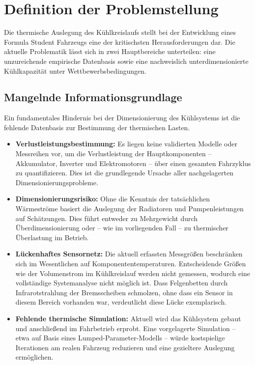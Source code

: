 \chapter{Definition der Problemstellung}
\label{ch:problemstellung}

Die thermische Auslegung des Kühlkreislaufs stellt bei der Entwicklung eines Formula Student Fahrzeugs eine der kritischsten Herausforderungen dar. Die aktuelle Problematik lässt sich in zwei Hauptbereiche unterteilen: eine unzureichende empirische Datenbasis sowie eine nachweislich unterdimensionierte Kühlkapazität unter Wettbewerbsbedingungen.

\section{Mangelnde Informationsgrundlage}
\label{sec:informationsgrundlage}

Ein fundamentales Hindernis bei der Dimensionierung des Kühlsystems ist die fehlende Datenbasis zur Bestimmung der thermischen Lasten.

\begin{itemize}
    \item \textbf{Verlustleistungsbestimmung:} Es liegen keine validierten Modelle oder Messreihen vor, um die Verlustleistung der Hauptkomponenten -- Akkumulator, Inverter und Elektromotoren -- über einen gesamten Fahrzyklus zu quantifizieren. Dies ist die grundlegende Ursache aller nachgelagerten Dimensionierungsprobleme.
    \item \textbf{Dimensionierungsrisiko:} Ohne die Kenntnis der tatsächlichen Wärmeströme basiert die Auslegung der Radiatoren und Pumpenleistungen auf Schätzungen. Dies führt entweder zu Mehrgewicht durch Überdimensionierung oder -- wie im vorliegenden Fall -- zu thermischer Überlastung im Betrieb.
    \item \textbf{Lückenhaftes Sensornetz:} Die aktuell erfassten Messgrößen beschränken sich im Wesentlichen auf Komponententemperaturen. Entscheidende Größen wie der Volumenstrom im Kühlkreislauf werden nicht gemessen, wodurch eine vollständige Systemanalyse nicht möglich ist. Dass Felgenbetten durch Infrarotstrahlung der Bremsscheiben schmolzen, ohne dass ein Sensor in diesem Bereich vorhanden war, verdeutlicht diese Lücke exemplarisch.
    \item \textbf{Fehlende thermische Simulation:} Aktuell wird das Kühlsystem gebaut und anschließend im Fahrbetrieb erprobt. Eine vorgelagerte Simulation -- etwa auf Basis eines Lumped-Parameter-Modells -- würde kostspielige Iterationen am realen Fahrzeug reduzieren und eine gezieltere Auslegung ermöglichen.
\end{itemize}

